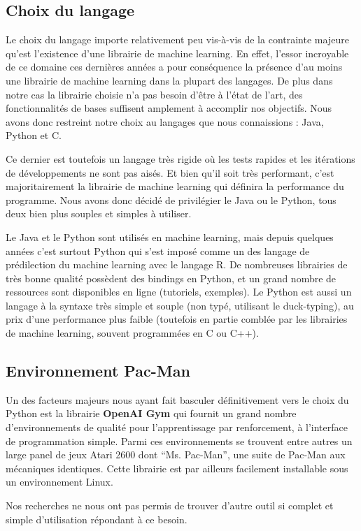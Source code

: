 \subsection{Choix du langage}
Le choix du langage importe relativement peu vis-à-vis de la contrainte majeure qu'est l'existence d'une librairie de machine learning. En effet, l'essor incroyable de ce domaine ces dernières années a pour conséquence la présence d'au moins une librairie de machine learning dans la plupart des langages. De plus dans notre cas la librairie choisie n'a pas besoin d'être à l'état de l'art, des fonctionnalités de bases suffisent amplement à accomplir nos objectifs. Nous avons donc restreint notre choix au langages que nous connaissions : Java, Python et C.
\par
Ce dernier est toutefois un langage très rigide où les tests rapides et les itérations de développements ne sont pas aisés.
Et bien qu'il soit très performant, c'est majoritairement la librairie de machine learning qui définira la performance du programme. Nous avons donc décidé de privilégier le Java ou le Python, tous deux bien plus souples et simples à utiliser.
\par
Le Java et le Python sont utilisés en machine learning, mais depuis quelques années c'est surtout Python qui s'est imposé comme un des langage de prédilection du machine learning avec le langage R. De nombreuses librairies de très bonne qualité possèdent des bindings en Python, et un grand nombre de ressources sont disponibles en ligne (tutoriels, exemples). Le Python est aussi un langage à la syntaxe très simple et souple (non typé, utilisant le duck-typing), au prix d'une performance plus faible (toutefois en partie comblée par les librairies de machine learning, souvent programmées en C ou C++).
\par



\subsection{Environnement Pac-Man}
Un des facteurs majeurs nous ayant fait basculer définitivement vers le choix du Python est la librairie \textbf{OpenAI Gym} qui fournit un grand nombre d'environnements de qualité pour l'apprentissage par renforcement, à l'interface de programmation simple. Parmi ces environnements se trouvent entre autres un large panel de jeux Atari 2600 dont ``Ms. Pac-Man'', une suite de Pac-Man aux mécaniques identiques. Cette librairie est par ailleurs facilement installable sous un environnement Linux.
\par
Nos recherches ne nous ont pas permis de trouver d'autre outil si complet et simple d'utilisation répondant à ce besoin.


